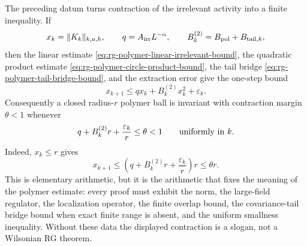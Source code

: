 The preceding datum turns contraction of the irrelevant activity into a
finite inequality.  If
\[
  x_k=\|K_k\|_{k,a,h},\qquad
  q=A_{\rm irr}L^{-\alpha},
  \qquad
  B^{(2)}_k=B_{\rm pol}+B_{{\rm tail},k},
\]
then the linear estimate
\eqref{eq:rg-polymer-linear-irrelevant-bound}, the quadratic product estimate
\eqref{eq:rg-polymer-circle-product-bound}, the tail bridge
\eqref{eq:rg-polymer-tail-bridge-bound}, and the extraction error give the
one-step bound
\begin{equation}
  x_{k+1}
  \leq
  qx_k+B^{(2)}_kx_k^2+\varepsilon_k .
  \label{eq:rg-polymer-recursion-budget}
\end{equation}
Consequently a closed radius-\(r\) polymer ball is invariant with contraction
margin \(\theta<1\) whenever
\begin{equation}
  q+B^{(2)}_kr+\frac{\varepsilon_k}{r}\leq \theta<1
  \qquad{\rm uniformly\ in\ }k .
  \label{eq:rg-polymer-contraction-smallness}
\end{equation}
Indeed, \(x_k\leq r\) gives
\[
  x_{k+1}
  \leq
  \left(q+B^{(2)}_kr+\frac{\varepsilon_k}{r}\right)r
  \leq \theta r .
\]
This is elementary arithmetic, but it is the arithmetic that fixes the
meaning of the polymer estimate: every proof must exhibit the norm, the
large-field regulator, the localization operator, the finite overlap bound,
the covariance-tail bridge bound when exact finite range is absent, and the
uniform smallness inequality.  Without these data the displayed contraction
is a slogan, not a Wilsonian RG theorem.


